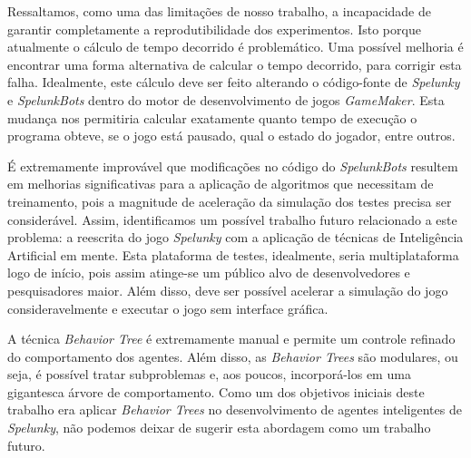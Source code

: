 Ressaltamos, como uma das limitações de nosso trabalho, a incapacidade de
garantir completamente a reprodutibilidade dos experimentos. Isto porque
atualmente o cálculo de tempo decorrido é problemático. Uma possível melhoria é
encontrar uma forma alternativa de calcular o tempo decorrido, para corrigir
esta falha. Idealmente, este cálculo deve ser feito alterando o código-fonte de
\textit{Spelunky} e \textit{SpelunkBots} dentro do motor de desenvolvimento de
jogos \textit{GameMaker}. Esta mudança nos permitiria calcular exatamente quanto
tempo de execução o programa obteve, se o jogo está pausado, qual o estado do
jogador, entre outros.

É extremamente improvável que modificações no código do \textit{SpelunkBots}
resultem em melhorias significativas para a aplicação de algoritmos que
necessitam de treinamento, pois a magnitude de aceleração da simulação dos
testes precisa ser considerável. Assim, identificamos um possível trabalho
futuro relacionado a este problema: a reescrita do jogo \textit{Spelunky} com a
aplicação de técnicas de Inteligência Artificial em mente. Esta plataforma de
testes, idealmente, seria multiplataforma logo de início, pois assim atinge-se
um público alvo de desenvolvedores e pesquisadores maior. Além disso, deve ser
possível acelerar a simulação do jogo consideravelmente e executar o jogo sem
interface gráfica.

A técnica \textit{Behavior Tree} é extremamente manual e permite um controle
refinado do comportamento dos agentes. Além disso, as \textit{Behavior Trees}
são modulares, ou seja, é possível tratar subproblemas e, aos poucos,
incorporá-los em uma gigantesca árvore de comportamento. Como um dos objetivos
iniciais deste trabalho era aplicar \textit{Behavior Trees} no desenvolvimento
de agentes inteligentes de \textit{Spelunky}, não podemos deixar de sugerir esta
abordagem como um trabalho futuro.
